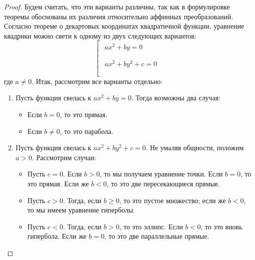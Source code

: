 \documentclass[11pt]{report}
\begin{document}
    \begin{proof}
    Будем считать, что эти варианты различны, так как в формулировке теоремы обоснованы их различия относительно аффинных преобразований. Согласно теореме о декартовых координатах квадратичной функции, уравнение квадрики можно свети к одному из двух следующих вариантов:
    \begin{equation*}
            \left[
      \begin{gathered}
          \begin{gathered}
            ax^2 + by = 0
            \\
          \end{gathered}
        \\
          \begin{gathered}
            ax^2 + by^2 + c = 0
            \\
          \end{gathered}
        \\
      \end{gathered}
    \right.
    \end{equation*}
    где $a \neq 0$. Итак, рассмотрим все варианты отдельно:
    \begin{enumerate}
        \item Пусть функция свелась к $ax^2 + by = 0$. Тогда возможны два случая:
        \begin{itemize}
            \item Если $b = 0$, то это прямая.
            \item Если $b \neq 0$, то это парабола.
        \end{itemize}
        \item Пусть функция свелась к $ax^2 + by^2 + c = 0$. Не умаляя общности, положим $a > 0$. Рассмотрим случаи:
    \begin{itemize}
        \item Пусть $c = 0$. Если $b > 0$, то мы получаем уравнение точки. Если $b = 0$, то это прямая. Если же $b < 0$, то это две пересекающиеся прямые.
        \item Пусть $c > 0$. Тогда, если $b \geq 0$, то это пустое множество; если же $b < 0$, то мы имеем уравнение гиперболы.
        \item Пусть $c < 0$. Тогда, если $b > 0$, то это эллипс. Если $b < 0$, то это вновь гипербола. Если же $b = 0$, то это две параллельные прямые.
    \end{itemize}
    \end{enumerate}
    \end{proof}
\end{document}

